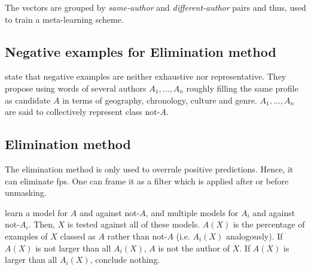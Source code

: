The vectors are grouped by \emph{same-author} and \emph{different-author} pairs and thus, 
used to train a meta-learning scheme.

\subsection{Negative examples for Elimination method}
\citet{koppel_authorship_2004} state that negative examples are neither exhaustive nor representative.
They propose using words of several authors $A_1, ..., A_n$ roughly filling the same profile as candidate $A$ 
in terms of geography, chronology, culture and genre.
$A_1, ..., A_n$ are said to collectively represent class not-$A$.

\subsection{Elimination method}

The elimination method is only used to overrule positive predictions.
Hence, it can eliminate \acp{fp}.
One can frame it as a filter which is applied after or before unmasking.

\citet{koppel_authorship_2004} learn a model for $A$ and against not-$A$, 
and multiple models for $A_i$ and against not-$A_i$.
Then, $X$ is tested against all of these models.
$A(X)$ is the percentage of examples of $X$ classed as $A$ rather than not-$A$ 
(i.e. $A_i(X)$ analogously).
If $A(X)$ is not larger than all $A_i(X)$, $A$ is not the author of $X$.
If $A(X)$ is larger than all $A_i(X)$, conclude nothing.
